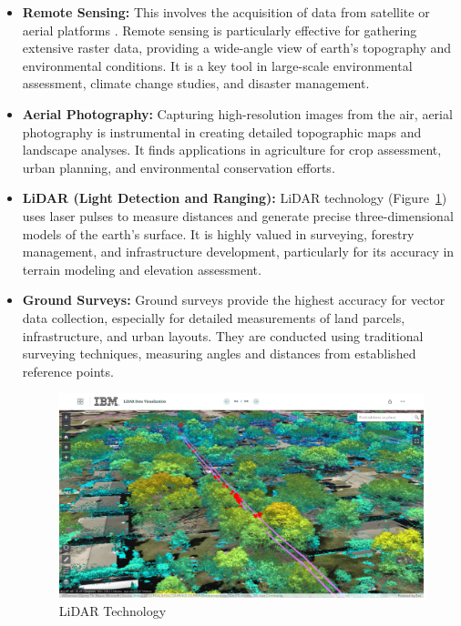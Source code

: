\documentclass[10pt,oneside,english,a4paper]{article}
\begin{document}
\begin{itemize}
\item \textbf{Remote Sensing:} This involves the acquisition of data from satellite or aerial platforms \cite{Novak1995}. Remote sensing is particularly effective for gathering extensive raster data, providing a wide-angle view of earth’s topography and environmental conditions. It is a key tool in large-scale environmental assessment, climate change studies, and disaster management.

\item \textbf{Aerial Photography:} Capturing high-resolution images from the air, aerial photography is instrumental in creating detailed topographic maps and landscape analyses. It finds applications in agriculture for crop assessment, urban planning, and environmental conservation efforts.

\item \textbf{LiDAR (Light Detection and Ranging):} LiDAR technology (Figure~\ref{fig:lidar}) uses laser pulses to measure distances and generate precise three-dimensional models of the earth's surface. It is highly valued in surveying, forestry management, and infrastructure development, particularly for its accuracy in terrain modeling and elevation assessment.

\item \textbf{Ground Surveys:} Ground surveys provide the highest accuracy for vector data collection, especially for detailed measurements of land parcels, infrastructure, and urban layouts. They are conducted using traditional surveying techniques, measuring angles and distances from established reference points.

\begin{figure}[h]
	\centering
	\includegraphics[scale = 0.2]{diagram9.png}
	\caption{LiDAR Technology \cite{IBM}}
	\label{fig:lidar}
\end{figure}

\end{itemize}
\end{document}
